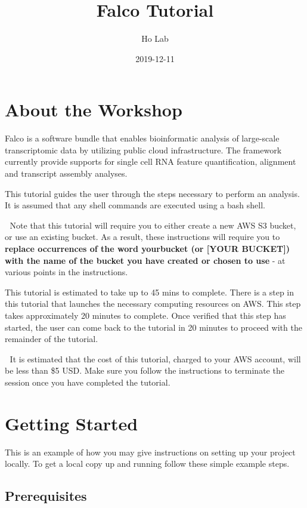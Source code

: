 \documentclass[
]{book}
\title{Falco Tutorial}
\author{Ho Lab}
\date{2019-12-11}
\begin{document}
\frontmatter
\maketitle

{
\setcounter{tocdepth}{1}
\tableofcontents
}
\mainmatter
\hypertarget{about-the-workshop}{%
\chapter{About the Workshop}\label{about-the-workshop}}

Falco is a software bundle that enables bioinformatic analysis of large-scale transcriptomic data by utilizing public cloud infrastructure. The framework currently provide supports for single cell RNA feature quantification, alignment and transcript assembly analyses.

This tutorial guides the user through the steps necessary to perform an analysis. It is assumed that any shell commands are executed using a bash shell.

🔴 Note that this tutorial will require you to either create a new AWS S3 bucket, or use an existing bucket. As a result, these instructions will require you to \textbf{replace occurrences of the word yourbucket (or {[}YOUR BUCKET{]}) with the name of the bucket you have created or chosen to use }- at various points in the instructions.

This tutorial is estimated to take up to 45 mins to complete. There is a step in this tutorial that launches the necessary computing resources on AWS. This step takes approximately 20 minutes to complete. Once verified that this step has started, the user can come back to the tutorial in 20 minutes to proceed with the remainder of the tutorial.

🔴 It is estimated that the cost of this tutorial, charged to your AWS account, will be less than \$5 USD. Make sure you follow the instructions to terminate the session once you have completed the tutorial.

\hypertarget{getting-started}{%
\chapter{Getting Started}\label{getting-started}}

This is an example of how you may give instructions on setting up your project locally. To get a local copy up and running follow these simple example steps.

\hypertarget{prerequisites}{%
\section{Prerequisites}\label{prerequisites}}
\end{document}
